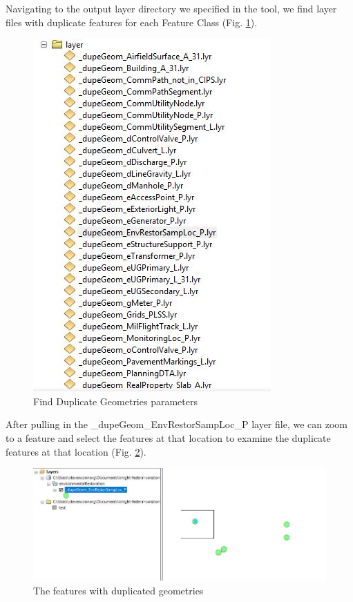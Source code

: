 \documentclass[openany]{book}
\theoremstyle{definition}
\theoremstyle{definition}
\theoremstyle{definition}
\theoremstyle{remark}
\begin{document}
Navigating to the output layer directory we specified in the tool, we
find layer files with duplicate features for each Feature Class (Fig.
\ref{fig:dupGlays}).

\begin{figure}[H]

{\centering \includegraphics{figures/dupG-lays} 

}

\caption{Find Duplicate Geometries parameters}\label{fig:dupGlays}
\end{figure}

After pulling in the \_dupeGeom\_EnvRestorSampLoc\_P layer file, we can
zoom to a feature and select the features at that location to examine
the duplicate features at that location (Fig. \ref{fig:layFeats}).

\begin{figure}[H]

{\centering \includegraphics{figures/dupG-layFeats} 

}

\caption{The features with duplicated geometries}\label{fig:layFeats}
\end{figure}
\end{document}
